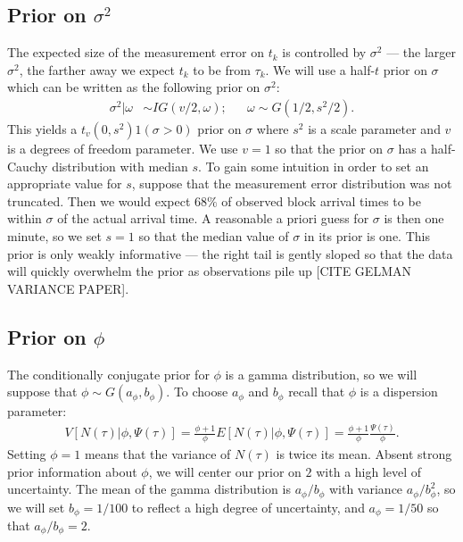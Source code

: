 \documentclass{article}
\begin{document}
\subsection{Prior on $\sigma^2$}
The expected size of the measurement error on $t_k$ is controlled by $\sigma^2$ --- the larger $\sigma^2$, the farther away we expect $t_k$ to be from $\tau_k$. We will use a half-$t$ prior on $\sigma$ which can be written as the following prior on $\sigma^2$:
\begin{align*}
\sigma^2|\omega &\sim IG(v/2, \omega); && \omega \sim G(1/2, s^2/2).
\end{align*}
This yields a $t_{v}(0,s^2)1(\sigma>0)$ prior on $\sigma$ where $s^2$ is a scale parameter and $v$ is a degrees of freedom parameter. We use $v=1$ so that the prior on $\sigma$ has a half-Cauchy distribution with median $s$. To gain some intuition in order to set an appropriate value for $s$, suppose that the measurement error distribution was not truncated. Then we would expect $68\%$ of observed block arrival times to be within $\sigma$ of the actual arrival time. A reasonable a priori guess for $\sigma$ is then one minute, so we set $s=1$ so that the median value of $\sigma$ in its prior is one. This prior is only weakly informative --- the right tail is gently sloped so that the data will quickly overwhelm the prior as observations pile up [CITE GELMAN VARIANCE PAPER]. 

\subsection{Prior on $\phi$}
The conditionally conjugate prior for $\phi$ is a gamma distribution, so we will suppose that $\phi \sim G(a_{\phi}, b_{\phi})$. To choose $a_\phi$ and $b_\phi$ recall that $\phi$ is a dispersion parameter:
\begin{align*}
V[N(\tau)|\phi,\Psi(\tau)] = \frac{\phi + 1}{\phi}E[N(\tau)|\phi,\Psi(\tau)] = \frac{\phi + 1}{\phi}\frac{\Psi(\tau)}{\phi}.
\end{align*}
Setting $\phi = 1$ means that the variance of $N(\tau)$ is twice its mean. Absent strong prior information about $\phi$, we will center our prior on $2$ with a high level of uncertainty. The mean of the gamma distribution is $a_\phi/b_\phi$ with variance $a_\phi/b_\phi^2$, so we will set $b_\phi = 1/100$ to reflect a high degree of uncertainty, and $a_\phi = 1/50$ so that $a_\phi/b_\phi = 2$.
\end{document}
